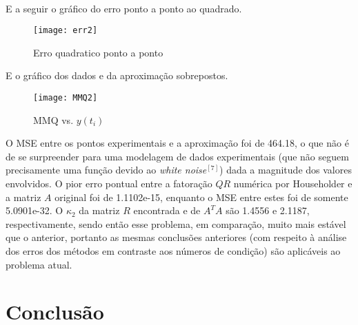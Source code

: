 \documentclass[a4paper, 12pt]{article}
\begin{document}
\\
E a seguir o gráfico do erro ponto a ponto ao quadrado.
\begin{figure}[H]
\centering
\caption{\label{fig:1} Erro quadratico ponto a ponto}
\texttt{[image: err2]}
\end{figure}
E o gráfico dos dados e da aproximação sobrepostos.
\begin{figure}[H]
\centering
\caption{\label{fig:2} MMQ vs. $y(t_i)$}
\texttt{[image: MMQ2]}
\end{figure}
O MSE entre os pontos experimentais e a aproximação foi de 464.18, o que não é de se surpreender para uma modelagem de dados experimentais (que não seguem precisamente uma função devido ao \textit{white noise}$^{[7]}$) dada a magnitude dos valores envolvidos. O pior erro pontual entre a fatoração $QR$ numérica por Householder e a matriz $A$ original foi de 1.1102e-15, enquanto o MSE entre estes foi de somente 5.0901e-32. O $\kappa_2$ da matriz $R$ encontrada e de $A^TA$ são 1.4556 e 2.1187, respectivamente, sendo então esse problema, em comparação, muito mais estável que o anterior, portanto as mesmas conclusões anteriores (com respeito à análise dos erros dos métodos em contraste aos números de condição) são aplicáveis ao problema atual. 
\section{Conclusão}
\end{document}
